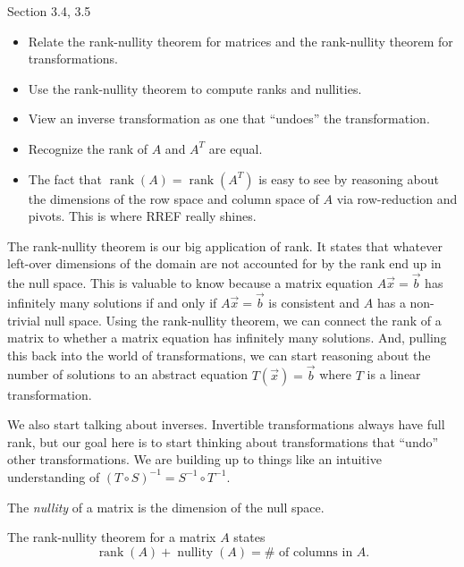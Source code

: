 \documentclass{problemset}
\DeclareMathOperator{\Rank}{rank}
\DeclareMathOperator{\Nullity}{nullity}
\begin{document}
\begin{lesson}

	Section 3.4, 3.5

	\begin{itemize}
		\item Relate the rank-nullity theorem for matrices and the rank-nullity theorem for transformations.
		\item Use the rank-nullity theorem to compute ranks and nullities.
		\item View an inverse transformation as one that ``undoes'' the transformation.
		\item Recognize the rank of $A$ and $A^T$ are equal.
	\end{itemize}

	\begin{annotation}
		\begin{notes}
			\begin{itemize}
				\item The fact that $\Rank(A)=\Rank(A^T)$ is easy to see by reasoning
					about the dimensions of the row space and column space of $A$
					via row-reduction and pivots. This is where RREF really shines.
			\end{itemize}
		\end{notes}
	\end{annotation}
	The rank-nullity theorem is our big application of rank. It states that whatever
	left-over dimensions of the domain are not accounted for by the rank end up in the null space.
	This is valuable to know because a matrix equation $A\vec x=\vec b$ has infinitely many
	solutions if and only if $A\vec x=\vec b$ is consistent and $A$ has a non-trivial null space. Using
	the rank-nullity theorem, we can connect the rank of a matrix to whether a matrix equation has infinitely
	many solutions. And, pulling this back into the world of transformations, we can start reasoning
	about the number of solutions to an abstract equation $T(\vec x)=\vec b$ where $T$ is a linear
	transformation.

	We also start talking about inverses. Invertible transformations always have full rank, but
	our goal here is to start thinking about transformations that ``undo'' other transformations. We
	are building up to things like an intuitive understanding of $(T\circ S)^{-1} = S^{-1}\circ T^{-1}$.

\end{lesson}
	\begin{theorem}
	The \emph{nullity} of a matrix is the dimension of the null space.

	The rank-nullity theorem for a matrix $A$ states
	\[
		\Rank(A)+\Nullity(A) = \#\text{ of columns in }A.
	\]
	\end{theorem}
\end{document}
